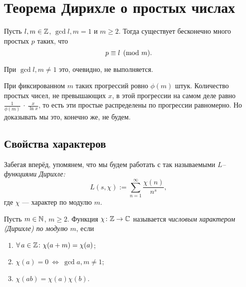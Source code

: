 



\section{Теорема Дирихле о простых числах}
\label{sec:II_Dirichlet-theorem}


\begin{ntheorem}
\label{thm:II-1}
    Пусть $l,m \in \mathbb{Z}$, $\gcd{l, m} = 1$ и $m \ge 2$. Тогда существует бесконечно много простых $p$ таких, что 
    \[
        p \equiv l \pmod m.
    \]
\end{ntheorem}

\begin{remark}
    При $\gcd{l, m} \ne 1$ это, очевидно, не выполняется.
\end{remark}

\begin{remark}
    При фиксированном $m$ таких прогрессий ровно $\phi(m)$ штук. Количество простых чисел, не превышающих $x$, в этой прогрессии на самом деле равно $\frac{1}{\phi(m)}~\cdot~\frac{x}{\ln{x}}$, то есть эти простые распределены по прогрессии равномерно. Но доказывать мы это, конечно же, не будем.
\end{remark}


\subsection{Свойства характеров}
\label{subsec:II-1}

\begin{remark}
    Забегая вперёд, упомянем, что мы будем работать с так называемыми \emph{$L$--функциями Дирихле:}
    \[
        L(s, \chi) := \sum_{n=1}^{\infty} \frac{\chi(n)}{n^s},
    \]
    где $\chi$ --- характер по модулю $m$.
\end{remark}

\begin{ndefinition}
\label{def:II_Dirichlet-character}
    Пусть $m \in \mathbb{N}$, $m \ge 2$. Функция $\chi\colon \mathbb{Z} \to \mathbb{C}$ называется \emph{числовым характером (Дирихле) по модулю $m$}, если
    \begin{enumerate}
        \item 
            $\forall a \in \ZZ\colon \chi(a+m) = \chi(a)$;
        \item 
            $\chi(a) = 0 \ \Leftrightarrow \ \gcd{a, m} \ne 1$;
        \item 
            $\chi(ab) = \chi(a)\chi(b)$.
    \end{enumerate}
\end{ndefinition}

